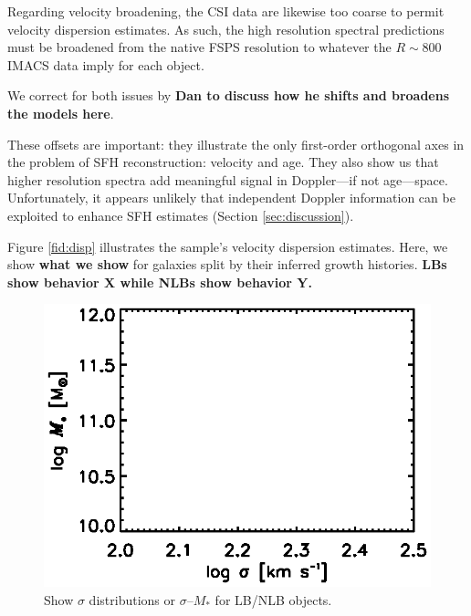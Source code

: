 \documentclass[a4paper,fleqn,usenatbib]{mnras}
\newcommand{\Mstel}{M_\ast}
\newcommand{\bfr}{\bf\color{red}}
\newcommand{\bfb}{\color{myblue}}
\begin{document}
Regarding velocity broadening, the CSI data are likewise too coarse to permit velocity
dispersion estimates. As such, the high resolution spectral predictions
must be broadened from the native FSPS resolution to whatever the $R\sim800$ IMACS data imply
for each object. 

We correct for both issues by {\bfr Dan to discuss how he shifts and broadens the models here}.

These offsets are important: they illustrate the only first-order orthogonal axes in the problem of SFH 
reconstruction: velocity and age. They also show us that higher resolution spectra add meaningful 
signal in Doppler---if not age---space. Unfortunately, it appears unlikely that independent Doppler
information can be exploited to enhance SFH estimates (Section \ref{sec:discussion}). 

Figure \ref{fid:disp} illustrates the sample's velocity dispersion estimates. Here, we show {\bfr what 
we show} for galaxies split by their inferred growth histories. {\bfr LBs show behavior X while NLBs
show behavior Y.} %

\begin{figure}
\centering
\includegraphics[scale = 0.9, trim = 1cm 0cm 0cm 0cm]{disp}
\caption{\bfb Show $\sigma$ distributions or $\sigma$--$\Mstel$ for LB/NLB objects.}
\label{fig:disp}
\end{figure}
\end{document}
